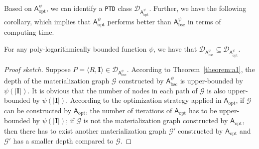 Based on $\mathsf{A}_{\text{opt}}^{\psi}$, we can identify a \texttt{PTD} class $\mathcal{D}_{\mathsf{A}_{\text{opt}}^{\psi}}$.
Further, we have the following corollary, which implies that $\mathsf{A}_{\text{opt}}^{\psi}$ performs better
than $\mathsf{A}_{\text{bsc}}^{\psi}$ in terms of computing time.

\begin{corollary}
For any poly-logarithmically bounded function $\psi$,
we have that $\mathcal{D}_{\mathsf{A}_{\text{bsc}}^{\psi}}\subseteq\mathcal{D}_{\mathsf{A}_{\text{opt}}^{\psi}}$.
\end{corollary}

\begin{proof}[Proof sketch]
Suppose $P=\langle R,\textbf{I}\rangle\in\mathcal{D}_{\mathsf{A}_{\text{bsc}}^{\psi}}$. According to Theorem~\ref{theorem:a1},
the depth of the materialization graph $\mathcal{G}$ constructed by $\mathsf{A}_{\text{bsc}}^{\psi}$ is 
upper-bounded by $\psi(|\textbf{I}|)$.
It is obvious that the number of nodes in each path of $\mathcal{G}$ is also upper-bounded by $\psi(|\textbf{I}|)$.
According to the optimization strategy applied in $\mathsf{A}_{\text{opt}}$, if $\mathcal{G}$ can be constructed
by $\mathsf{A}_{\text{opt}}$, the number of iterations of $\mathsf{A}_{\text{opt}}$ has to be upper-bounded by $\psi(|\textbf{I}|)$;
if $\mathcal{G}$ is not the materialization graph constructed
by $\mathsf{A}_{\text{opt}}$, then there has to exist another materialization graph $\mathcal{G}'$ constructed by $\mathsf{A}_{\text{opt}}$
and $\mathcal{G}'$ has a smaller depth compared to $\mathcal{G}$.
\end{proof}




